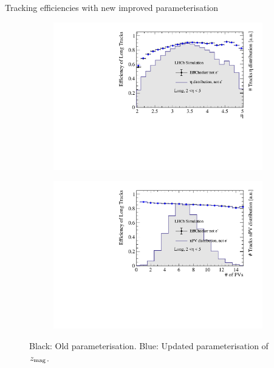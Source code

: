 \documentclass[xcolor={dvipsnames}]{beamer}
\begin{document}
\begin{frame}{Tracking efficiencies with new improved parameterisation}
\begin{figure}[htb]
\begin{subfigure}{0.45\textwidth}
      \includegraphics[width=1\textwidth]{Plots/TrackEfficiency_eta_official_MC_old_new_parameterisation_comparison.pdf}
    \end{subfigure}%
    \begin{subfigure}{0.45\textwidth}
      \includegraphics[width=1\textwidth]{Plots/TrackEfficiency_nPV_official_MC_old_new_parameterisation_comparison.pdf}
    \end{subfigure}
    \vspace{-0.2cm}
    \caption*{Black: Old parameterisation. {\color{blue}Blue: Updated parameterisation of $z_{\rm mag}$}.}
  \end{figure}
\end{frame}
\end{document}
